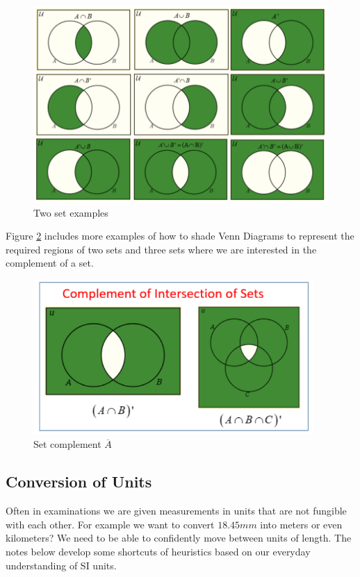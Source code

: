 \begin{figure}[h]
    \centering
    \includegraphics[width=1.25\textwidth]{set1}
    \caption{Two set examples}
    \label{fig:example1}
\end{figure}

Figure \ref{fig:example0} includes more examples of how to shade Venn Diagrams to represent the required regions of two sets and three sets where we are interested in the complement of a set.

\begin{figure}[h]
    \centering
    \includegraphics[width=0.95\textwidth]{set0}
    \caption{Set complement $\overline{A}$}
    \label{fig:example0}
\end{figure}

\subsection{Conversion of Units}

Often in examinations we are given measurements in units that are not fungible with each other. For example we want to convert $18.45 mm$ into meters or even kilometers?  We need to be able to confidently move between units of length. The notes below develop some shortcuts of heuristics based on our everyday understanding of SI units.

